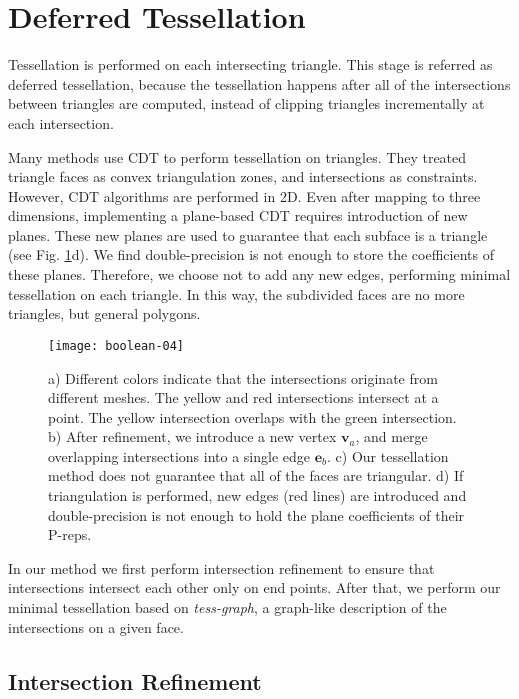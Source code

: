 
\section{Deferred Tessellation}


\label{sec:tessellation}

Tessellation is performed on each intersecting triangle. This stage is referred as deferred tessellation, because the tessellation happens after all of the intersections between triangles are computed, instead of clipping triangles incrementally at each intersection.

Many methods use CDT to perform tessellation on triangles. They treated triangle faces as convex triangulation zones, and intersections as constraints. However, CDT algorithms \cite{chew1989constrained,preparata2012computational} are performed in 2D. Even after mapping to three dimensions, implementing a plane-based CDT requires introduction of new planes. These new planes are used to guarantee that each subface is a triangle (see Fig. \ref{fig:iisect}d). We find double-precision is not enough to store the coefficients of these planes. Therefore, we choose not to add any new edges, performing minimal tessellation on each triangle. In this way, the subdivided faces are no more triangles, but general polygons.

\begin{figure}[t]
\centering
\texttt{[image: boolean-04]}
\caption{a) Different colors indicate that the intersections originate from different meshes. The yellow and red intersections intersect at a point. The yellow intersection overlaps with the green intersection. b) After refinement, we introduce a new vertex $\bm{v}_a$, and merge overlapping intersections into a single edge $\bm{e}_b$. c) Our tessellation method does not guarantee that all of the faces are triangular. d) If triangulation is performed, new edges (red lines) are introduced and double-precision is not enough to hold the plane coefficients of their P-reps.}
\label{fig:iisect}
\end{figure}


In our method we first perform intersection refinement to ensure that intersections intersect each other only on end points. After that, we perform our minimal tessellation based on \emph{tess-graph}, a graph-like description of the intersections on a given face.

\subsection{Intersection Refinement}

